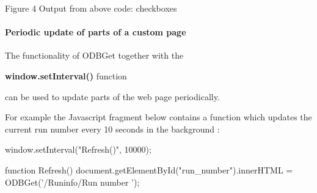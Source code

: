 \par
\par
\par
 \begin{center} Figure 4 Output from above code: checkboxes \par
\par
\par
  \par
\par
\par
 \end{center} 

\par


\par


\label{RC_mhttpd_custom_ODB_access_features_idx_mhttpd_page_custom_refresh_partial}
\hypertarget{RC_mhttpd_custom_ODB_access_features_idx_mhttpd_page_custom_refresh_partial}{}
 \hypertarget{RC_mhttpd_custom_ODB_access_features_RC_mhttpd_js_update_part}{}\paragraph{Periodic update of parts of a custom page}\label{RC_mhttpd_custom_ODB_access_features_RC_mhttpd_js_update_part}
The functionality of ODBGet together with the
\begin{DoxyItemize}
\item {\bfseries window.setInterval()} function
\end{DoxyItemize}

can be used to update parts of the web page periodically. \par
 For example the Javascript fragment below contains a function which updates the current run number every 10 seconds in the background : 
\begin{DoxyCode}
  window.setInterval("Refresh()", 10000);

  function Refresh() {
    document.getElementById("run_number").innerHTML = ODBGet('/Runinfo/Run number
      ');
  }
\end{DoxyCode}


